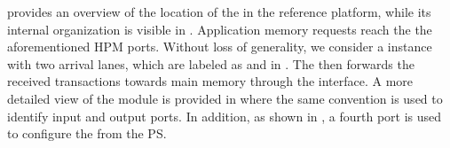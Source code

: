 
 provides an overview of the location of the
\schim in the reference platform, while its internal organization is
visible in . Application memory
requests reach the \schim the aforementioned HPM ports. Without loss
of generality, we consider a \schim instance with two arrival lanes,
which are labeled as  and  in
. The \schim then forwards the
received transactions towards main memory through the \axiout{}
interface. A more detailed view of the \schim module is provided in
 where the same convention is used to
identify input and output ports. In addition, as shown in
, a fourth \axiconf{} port is used to
configure the \schim from the PS.




